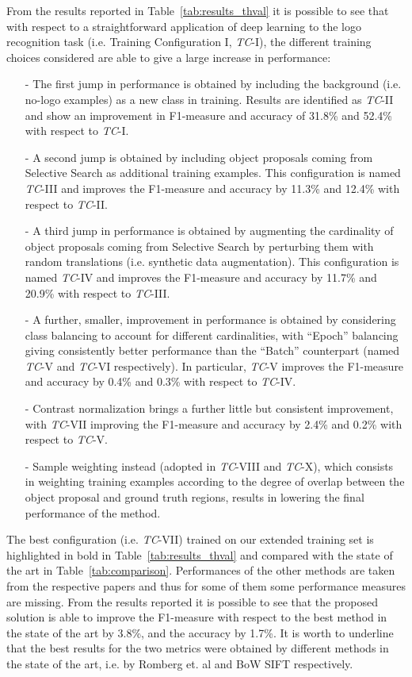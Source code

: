 \documentclass[final,5p,twocolumn]{elsarticle}
\begin{document}
From the results reported in Table~\ref{tab:results_thval} it is possible to see that with respect to a straightforward application of deep learning to the logo recognition task (i.e. Training Configuration I, \emph{TC}-I), the different training choices considered are able to give a large increase in performance:
\begin{itemize}
\item[-] The first jump in performance is obtained by including the background (i.e. no-logo examples) as a new class in training. Results are identified as \emph{TC}-II and show an improvement in F1-measure and accuracy of 31.8\% and 52.4\% with respect to \emph{TC}-I.
\item[-] A second jump is obtained by including object proposals coming from Selective Search as additional training examples. This configuration is named \emph{TC}-III and improves the F1-measure and accuracy by 11.3\% and 12.4\% with respect to \emph{TC}-II.
\item[-] A third jump in performance is obtained by augmenting the cardinality of object proposals coming from Selective Search by perturbing them with random translations (i.e. synthetic data augmentation). This configuration is named \emph{TC}-IV and improves the F1-measure and accuracy by 11.7\% and 20.9\% with respect to \emph{TC}-III.
\item[-] A further, smaller, improvement in performance is obtained by considering class balancing to account for different cardinalities, with ``Epoch'' balancing giving consistently better performance than the ``Batch'' counterpart (named \emph{TC}-V and \emph{TC}-VI respectively). In particular, \emph{TC}-V improves the F1-measure and accuracy by 0.4\% and 0.3\% with respect to \emph{TC}-IV.
\item[-] Contrast normalization brings a further little but consistent improvement, with \emph{TC}-VII improving the F1-measure and accuracy by 2.4\% and 0.2\% with respect to \emph{TC}-V.
\item[-] Sample weighting instead (adopted in \emph{TC}-VIII and \emph{TC}-X), which consists in weighting training examples according to the degree of overlap between the object proposal and ground truth regions, results in lowering the final performance of the method.
\end{itemize}
The best configuration (i.e. \emph{TC}-VII) trained on our extended training set is highlighted in bold in Table~\ref{tab:results_thval} and compared with the state of the art in Table~\ref{tab:comparison}. Performances of the other methods are taken from the respective papers and thus for some of them some performance measures are missing.
From the results reported it is possible to see that the proposed solution is able to improve the F1-measure with respect to the best method in the state of the art by 3.8\%, and the accuracy by 1.7\%. It is worth to underline that the best results for the two metrics were obtained by different methods in the state of the art, i.e. by  Romberg et. al \cite{romberg2013bundle} and BoW SIFT \cite{romberg2013bundle} respectively.
\end{document}
